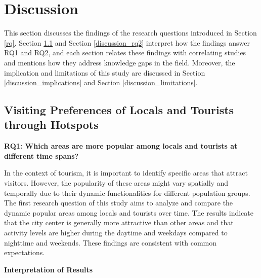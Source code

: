 \documentclass{article}
\theoremstyle{remark}
\begin{document}
\section{Discussion}
This section discusses the findings of the research questions introduced in Section \ref{rq}. Section \ref{discussion_rq1} and Section \ref{discussion_rq2} interpret how the findings answer RQ1 and RQ2, and each section relates these findings with correlating studies and mentions how they address knowledge gaps in the field. Moreover, the implication and limitations of this study are discussed in Section \ref{discussion_implications} and Section \ref{discussion_limitations}.

\subsection{Visiting Preferences of Locals and Tourists through Hotspots} \label{discussion_rq1}
\textbf{RQ1: Which areas are more popular among locals and tourists at different time spans?}

In the context of tourism, it is important to identify specific areas that attract visitors. However, the popularity of these areas might vary spatially and temporally due to their dynamic functionalities for different population groups. The first research question of this study aims to analyze and compare the dynamic popular areas among locals and tourists over time. The results indicate that the city center is generally more attractive than other areas and that activity levels are higher during the daytime and weekdays compared to nighttime and weekends. These findings are consistent with common expectations.

\textbf{Interpretation of Results}
\end{document}
